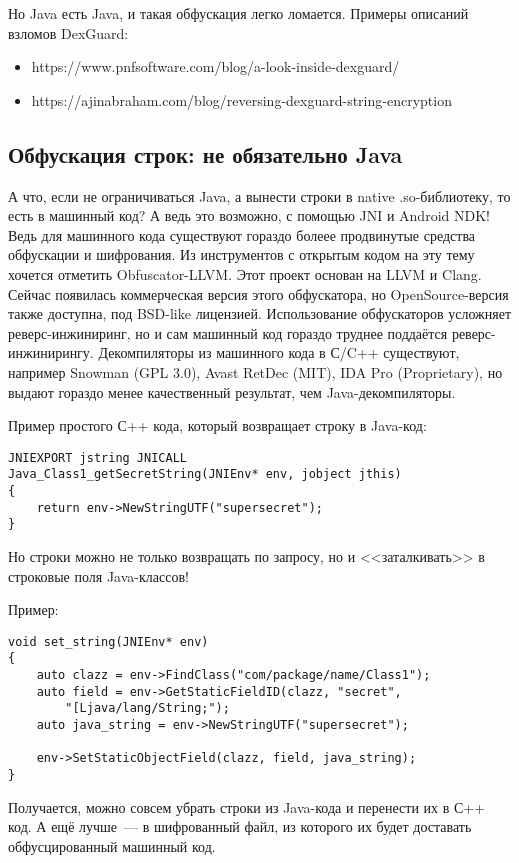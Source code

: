 \documentclass[10pt, a5paper]{article}
\begin{document}
Но Java есть Java, и такая обфускация легко ломается. Примеры описаний взломов DexGuard:

\begin{itemize}
  \item https://www.pnfsoftware.com/blog/a-look-inside-dexguard/
  \item https://ajinabraham.com/blog/reversing-dexguard-string-\linebreak encryption
\end{itemize}

\subsection*{Обфускация строк: не обязательно Java}

А что, если не ограничиваться Java, а вынести строки в native .so-библиотеку, то есть в машинный код? А ведь это возможно, с помощью JNI и Android NDK!  Ведь для машинного кода существуют гораздо болеее продвинутые средства обфускации и шифрования. Из инструментов с открытым кодом на эту тему хочется отметить Obfuscator-LLVM. Этот проект основан на LLVM и Clang. Сейчас появилась коммерческая версия этого обфускатора, но OpenSource-версия также доступна, под BSD-like лицензией. Использование обфускаторов усложняет реверс-инжиниринг, но и сам машинный код гораздо труднее поддаётся реверс-инжинирингу. Декомпиляторы из машинного кода в С/C++ существуют, например Snowman (GPL 3.0), Avast RetDec (MIT), IDA Pro (Proprietary), но выдают гораздо менее качественный результат, чем Java-декомпиляторы.

Пример простого С++ кода, который возвращает строку в Java-код:

\begin{verbatim}
JNIEXPORT jstring JNICALL
Java_Class1_getSecretString(JNIEnv* env, jobject jthis)
{
    return env->NewStringUTF("supersecret");
}
\end{verbatim}
Но строки можно не только возвращать по запросу, но и <<заталкивать>> в строковые поля Java-классов!

Пример:

\begin{verbatim}
void set_string(JNIEnv* env)
{
    auto clazz = env->FindClass("com/package/name/Class1");
    auto field = env->GetStaticFieldID(clazz, "secret", 
		"[Ljava/lang/String;");
    auto java_string = env->NewStringUTF("supersecret");

    env->SetStaticObjectField(clazz, field, java_string);
}
\end{verbatim}
Получается, можно совсем убрать строки из Java-кода и перенести их в С++ код. А ещё лучше~--- в шифрованный файл, из которого их будет доставать обфусцированный машинный код.
\end{document}
